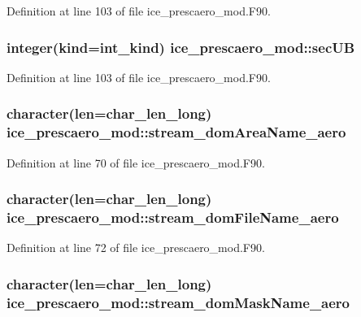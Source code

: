 Definition at line 103 of file ice\_\-prescaero\_\-mod.F90.\hypertarget{namespaceice__prescaero__mod_a635da64637bdade19196f7e407c86f3b}{
\subsubsection[{secUB}]{\setlength{\rightskip}{0pt plus 5cm}integer(kind=int\_\-kind) {\bf ice\_\-prescaero\_\-mod::secUB}}}
\label{namespaceice__prescaero__mod_a635da64637bdade19196f7e407c86f3b}


Definition at line 103 of file ice\_\-prescaero\_\-mod.F90.\hypertarget{namespaceice__prescaero__mod_afc3d3f278ce9859e477534269596e82f}{
\subsubsection[{stream\_\-domAreaName\_\-aero}]{\setlength{\rightskip}{0pt plus 5cm}character(len=char\_\-len\_\-long) {\bf ice\_\-prescaero\_\-mod::stream\_\-domAreaName\_\-aero}}}
\label{namespaceice__prescaero__mod_afc3d3f278ce9859e477534269596e82f}


Definition at line 70 of file ice\_\-prescaero\_\-mod.F90.\hypertarget{namespaceice__prescaero__mod_a4b93709d4642b42b9af488601bef97f6}{
\subsubsection[{stream\_\-domFileName\_\-aero}]{\setlength{\rightskip}{0pt plus 5cm}character(len=char\_\-len\_\-long) {\bf ice\_\-prescaero\_\-mod::stream\_\-domFileName\_\-aero}}}
\label{namespaceice__prescaero__mod_a4b93709d4642b42b9af488601bef97f6}


Definition at line 72 of file ice\_\-prescaero\_\-mod.F90.\hypertarget{namespaceice__prescaero__mod_a9ba2c680142ab95e945ff4071df68330}{
\subsubsection[{stream\_\-domMaskName\_\-aero}]{\setlength{\rightskip}{0pt plus 5cm}character(len=char\_\-len\_\-long) {\bf ice\_\-prescaero\_\-mod::stream\_\-domMaskName\_\-aero}}}
\label{namespaceice__prescaero__mod_a9ba2c680142ab95e945ff4071df68330}


